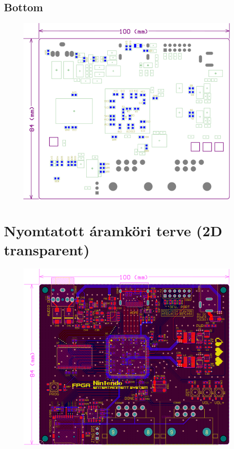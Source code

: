 \subsection{Bottom}
\label{sec:NES-components-bottom}
\begin{figure}[H]
	\centering
	\includegraphics[width=173mm, keepaspectratio, angle=90]{figures/NES-components-bottom}
\end{figure}

\section{Nyomtatott áramköri terve (2D transparent)}
\label{sec:FPGA-nes-transparency}
\begin{figure}[H]
	\centering
	\includegraphics[width=173mm, keepaspectratio, angle=90]{figures/FPGA-nes-transparency}
\end{figure}

